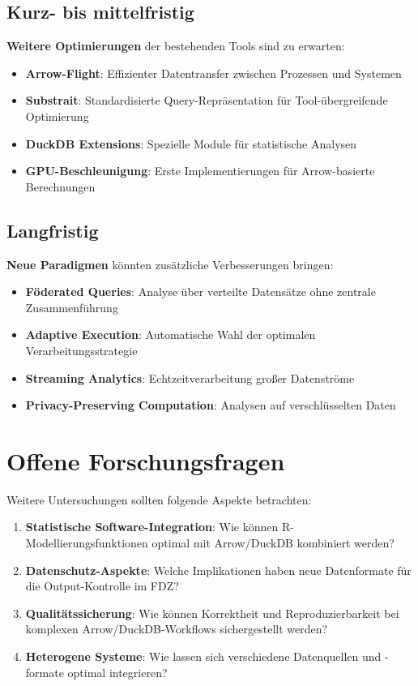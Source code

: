 \documentclass[
  ngerman,
  10pt,
  letterpaper,
  twocolumn]{book}
\providecommand{\tightlist}{%
  \setlength{\itemsep}{0pt}\setlength{\parskip}{0pt}}
\begin{document}
\subsection{Kurz- bis mittelfristig}\label{kurz--bis-mittelfristig}

\textbf{Weitere Optimierungen} der bestehenden Tools sind zu erwarten:

\begin{itemize}
\tightlist
\item
  \textbf{Arrow-Flight}: Effizienter Datentransfer zwischen Prozessen
  und Systemen
\item
  \textbf{Substrait}: Standardisierte Query-Repräsentation für
  Tool-übergreifende Optimierung
\item
  \textbf{DuckDB Extensions}: Spezielle Module für statistische Analysen
\item
  \textbf{GPU-Beschleunigung}: Erste Implementierungen für
  Arrow-basierte Berechnungen
\end{itemize}

\subsection{Langfristig}\label{langfristig}

\textbf{Neue Paradigmen} könnten zusätzliche Verbesserungen bringen:

\begin{itemize}
\tightlist
\item
  \textbf{Föderated Queries}: Analyse über verteilte Datensätze ohne
  zentrale Zusammenführung
\item
  \textbf{Adaptive Execution}: Automatische Wahl der optimalen
  Verarbeitungsstrategie
\item
  \textbf{Streaming Analytics}: Echtzeitverarbeitung großer Datenströme
\item
  \textbf{Privacy-Preserving Computation}: Analysen auf verschlüsselten
  Daten
\end{itemize}

\section{Offene Forschungsfragen}\label{offene-forschungsfragen}

Weitere Untersuchungen sollten folgende Aspekte betrachten:

\begin{enumerate}
\def\labelenumi{\arabic{enumi}.}
\item
  \textbf{Statistische Software-Integration}: Wie können
  R-Modellierungsfunktionen optimal mit Arrow/DuckDB kombiniert werden?
\item
  \textbf{Datenschutz-Aspekte}: Welche Implikationen haben neue
  Datenformate für die Output-Kontrolle im FDZ?
\item
  \textbf{Qualitätssicherung}: Wie können Korrektheit und
  Reproduzierbarkeit bei komplexen Arrow/DuckDB-Workflows sichergestellt
  werden?
\item
  \textbf{Heterogene Systeme}: Wie lassen sich verschiedene Datenquellen
  und -formate optimal integrieren?
\end{enumerate}
\end{document}
